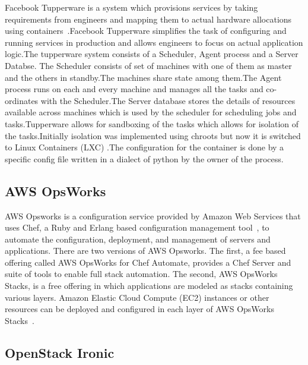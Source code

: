 Facebook Tupperware is a system which provisions services by taking
requirements from engineers and mapping them to actual hardware
allocations using containers~\cite{www-FaceTup}.Facebook Tupperware
simplifies the task of configuring and running services in production
and allows engineers to focus on actual application logic.The
tupperware system consists of a Scheduler, Agent process and a Server
Databse.  The Scheduler consists of set of machines with one of them
as master and the others in standby.The machines share state among
them.The Agent process runs on each and every machine and manages all
the tasks and co-ordinates with the Scheduler.The Server database
stores the details of resources available across machines which is
used by the scheduler for scheduling jobs and tasks.Tupperware allows
for sandboxing of the tasks which allows for isolation of the
tasks.Initially isolation was implemented using chroots but now it is
switched to Linux Containers (LXC) .The configuration for the
container is done by a specific config file written in a dialect of
python by the owner of the process.

\subsection{AWS OpsWorks}

AWS Opsworks is a configuration service provided by Amazon Web
Services that uses Chef, a Ruby and Erlang based configuration
management tool~\cite{www-wikichef}, to automate the configuration,
deployment, and management of servers and applications. There are two
versions of AWS Opsworks.  The first, a fee based offering called AWS
OpsWorks for Chef Automate, provides a Chef Server and suite of tools
to enable full stack automation. The second, AWS OpsWorks Stacks, is a
free offering in which applications are modeled as stacks containing
various layers. Amazon Elastic Cloud Compute (EC2) instances or other
resources can be deployed and configured in each layer of AWS OpsWorks
Stacks~\cite{www-awsopsworks}.

\subsection{OpenStack Ironic}

